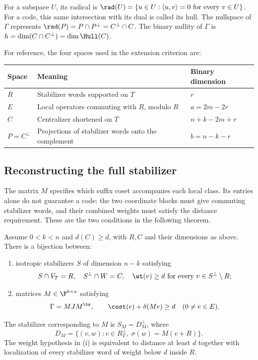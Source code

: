 For a subspace \(U\), its radical is
\(\rad(U)=\{u\in U:\langle u,v\rangle=0\text{ for every }v\in U\}\).
For a code, this same intersection with its dual is called its hull.
The nullspace of \(\Gamma\) represents \(\rad(P)=P\cap P^\perp
=C^\perp\cap C\). The binary nullity of \(\Gamma\) is
\(h=\dim(C\cap C^\perp)=\dim\Hull(C)\).

For reference, the four spaces used in the extension criterion are:
\begin{center}\small
\begin{tabularx}{\linewidth}{@{}lXl@{}}\toprule
Space&Meaning&Binary dimension\\\midrule
\(R\)&Stabilizer words supported on \(T\)&\(r\)\\
\(E\)&Local operators commuting with \(R\), modulo \(R\)&\(a=2m-2r\)\\
\(C\)&Centralizer shortened on \(T\)&\(n+k-2m+r\)\\
\(P=C^\perp\)&Projections of stabilizer words onto the complement&\(b=n-k-r\)\\\bottomrule
\end{tabularx}
\end{center}

\subsection{Reconstructing the full stabilizer}

The matrix \(M\) specifies which suffix coset accompanies each local
class. Its entries alone do not guarantee a code: the two coordinate
blocks must give commuting stabilizer words, and their combined weights
must satisfy the distance requirement. These are the two conditions in
the following theorem.

\begin{theorem}\label{thm:extension}
Assume \(0<k<n\) and \(d(C)\geq d\), with \(R,C\) and their dimensions
as above.
There is a bijection between:
\begin{enumerate}[label=(\roman*)]
\item isotropic stabilizers \(S\) of dimension \(n-k\) satisfying
\[
 S\cap V_T=R,\quad S^\perp\cap W=C,\quad
 \wt(v)\geq d\ \text{for every }v\in S^\perp\setminus R;
\]
\item matrices \(M\in\F^{b\times a}\) satisfying
\begin{equation}\label{eq:exact}
 \Gamma=MJM^\tr,\qquad
 \cost(e)+\delta(Me)\geq d\quad(0\ne e\in E).
\end{equation}
\end{enumerate}
The stabilizer corresponding to \(M\) is \(S_M=D_M^\perp\), where
\begin{equation}\label{eq:graph-D}
 D_M=\{(v,w):v\in R_T^\perp,\ \sigma(w)=M(v+R)\}.
\end{equation}
The weight hypothesis in (i) is equivalent to distance at least \(d\)
together with localization of every stabilizer word of weight below \(d\)
inside \(R\).
\end{theorem}

